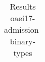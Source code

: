 \begin{table}[htb]
{\begin{tabular}[tb]{llllllllllllllllllllllllllllllllllllllll}
\end{tabular}

}

\caption{Results oaei17-admission-binary-types}

\label{tbl:results}

\end{table}
